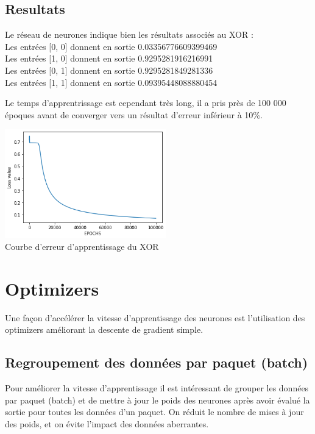 \documentclass[12pt,a4paper, french]{article}
\begin{document}
\subsection{Resultats}
Le réseau de neurones indique bien les résultats associés au XOR :
\\
\noindent 
\textsf{
Les entrées [0, 0] donnent en sortie 0.03356776609399469 \\ 
Les entrées [1, 0] donnent en sortie 0.9295281916216991  \\
Les entrées [0, 1] donnent en sortie 0.9295281849281336  \\
Les entrées [1, 1] donnent en sortie 0.09395448088880454  \\
}

Le temps d'apprentrissage est cependant très long, il a pris près de 100 000 époques avant de converger vers un résultat d'erreur inférieur à 10\%.

\begin{center}
    \includegraphics[width=7cm]{1-Courbe d'erreur d'apprentissage du XOR.png} \\
    Courbe d'erreur d'apprentissage du XOR
\end{center}

\section{Optimizers}
Une façon d'accélérer la vitesse d'apprentissage des neurones est l'utilisation des optimizers améliorant la descente de gradient simple.

\subsection{Regroupement des données par paquet (batch)}
Pour améliorer la vitesse d'apprentissage il est intéressant de grouper les données par paquet (batch) et de mettre à jour le poids des neurones après avoir évalué la sortie pour toutes les données d'un paquet. On réduit le nombre de mises à jour des poids, et on évite l'impact des données aberrantes.  
\end{document}
